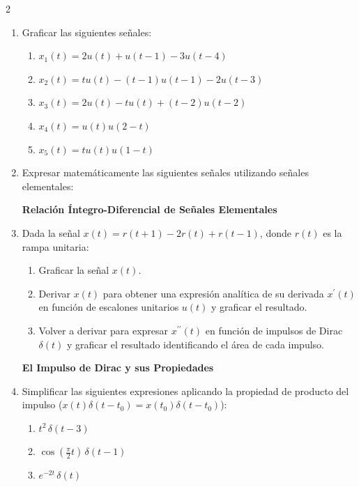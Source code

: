 \documentclass[10pt,a4paper]{article}
\begin{document}
\begin{multicols}{2}
\begin{enumerate}
		\vspace{1em}
		\begin{center}
			\textbf{\large Parte III: Señales Elementales}
		\end{center}
		\vspace{-0.5em}

		\textbf{Graficación y Expresión Matemática}
			\item {Graficar las siguientes señales:}
			\begin{enumerate}
				\item $x_1(t)=2u(t)+u(t-1)-3u(t-4)$
				\item $x_2(t)=tu(t)-(t-1)u(t-1)-2u(t-3)$
				\item $x_3(t)=2u(t)-tu(t)+(t-2)u(t-2)$
				\item $x_4(t)=u(t)u(2-t)$
				\item $x_5(t)=tu(t)u(1-t)$
			\end{enumerate}

			\item {Expresar matemáticamente las siguientes señales utilizando señales elementales:}

\begin{center}
	
	\hspace{1cm}
	
\end{center}

            \textbf{Relación Íntegro-Diferencial de Señales Elementales}
            \item Dada la señal $x(t) = r(t+1) - 2r(t) + r(t-1)$, donde $r(t)$ es la rampa unitaria:
            \begin{enumerate}
                \item Graficar la señal $x(t)$.
                \item Derivar $x(t)$ para obtener una expresión analítica de su derivada $x^{\prime}(t)$ en función de escalones unitarios $u(t)$ y graficar el resultado.
                \item Volver a derivar para expresar $x^{\prime\prime}(t)$ en función de impulsos de Dirac $\delta(t)$ y graficar el resultado identificando el área de cada impulso.
            \end{enumerate}

            \textbf{El Impulso de Dirac y sus Propiedades}
            \item Simplificar las siguientes expresiones aplicando la propiedad de producto del impulso ($x(t)\delta(t-t_0) = x(t_0)\delta(t-t_0)$):
            \begin{enumerate}
                \item $t^2 \, \delta(t-3)$
                \item $\cos\left(\frac{\pi}{2}t\right) \, \delta(t-1)$
                \item $e^{-2t} \, \delta(t)$
            \end{enumerate}


\end{enumerate}
\end{multicols}
\end{document}
